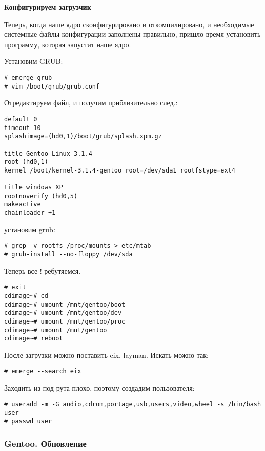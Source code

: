 \documentclass[10pt, a4paper]{article}
\begin{document}
{\bf Конфигурируем загрузчик}

Теперь, когда наше ядро сконфигурировано и откомпилировано, и необходимые системные файлы конфигурации заполнены правильно, пришло время установить программу, которая запустит наше ядро.

Установим GRUB:

\begin{verbatim}
# emerge grub
# vim /boot/grub/grub.conf
\end{verbatim}

Отредактируем файл, и получим приблизительно след.:

\begin{verbatim}
default 0
timeout 10
splashimage=(hd0,1)/boot/grub/splash.xpm.gz

title Gentoo Linux 3.1.4
root (hd0,1)
kernel /boot/kernel-3.1.4-gentoo root=/dev/sda1 rootfstype=ext4

title windows XP
rootnoverify (hd0,5)
makeactive
chainloader +1
\end{verbatim}

установим grub:

\begin{verbatim}
# grep -v rootfs /proc/mounts > etc/mtab
# grub-install --no-floppy /dev/sda
\end{verbatim}

Теперь все ! ребутяемся.

\begin{verbatim}
# exit 
cdimage~# cd 
cdimage~# umount /mnt/gentoo/boot   
cdimage~# umount /mnt/gentoo/dev 
cdimage~# umount /mnt/gentoo/proc 
cdimage~# umount /mnt/gentoo
cdimage~# reboot

\end{verbatim}

После загрузки можно поставить eix, layman.
Искать можно так:
\begin{verbatim}
# emerge --search eix
\end{verbatim}

Заходить из под рута плохо, поэтому создадим пользователя:
\begin{verbatim}
# useradd -m -G audio,cdrom,portage,usb,users,video,wheel -s /bin/bash user
# passwd user
\end{verbatim}

\subsubsection{Gentoo. Обновление}
\end{document}
